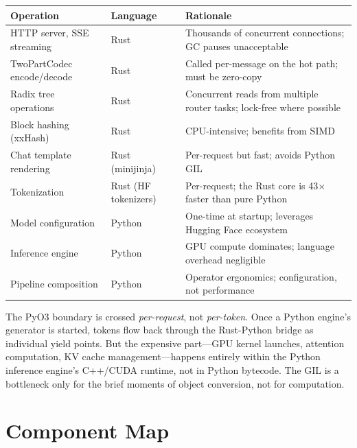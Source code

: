 \begin{center}
\small
\begin{tabular}{llp{7.5cm}}
\toprule
\textbf{Operation} & \textbf{Language} & \textbf{Rationale} \\
\midrule
HTTP server, SSE streaming & Rust & Thousands of concurrent connections; GC pauses unacceptable \\
TwoPartCodec encode/decode & Rust & Called per-message on the hot path; must be zero-copy \\
Radix tree operations & Rust & Concurrent reads from multiple router tasks; lock-free where possible \\
Block hashing (xxHash) & Rust & CPU-intensive; benefits from SIMD \\
Chat template rendering & Rust (minijinja) & Per-request but fast; avoids Python GIL \\
Tokenization & Rust (HF tokenizers) & Per-request; the Rust core is 43$\times$ faster than pure Python \\
Model configuration & Python & One-time at startup; leverages Hugging Face ecosystem \\
Inference engine & Python & GPU compute dominates; language overhead negligible \\
Pipeline composition & Python & Operator ergonomics; configuration, not performance \\
\bottomrule
\end{tabular}
\end{center}

\begin{insightbox}
The PyO3 boundary is crossed \emph{per-request}, not \emph{per-token}. Once a Python engine's generator is started, tokens flow back through the Rust-Python bridge as individual yield points. But the expensive part---GPU kernel launches, attention computation, KV cache management---happens entirely within the Python inference engine's C++/CUDA runtime, not in Python bytecode. The GIL is a bottleneck only for the brief moments of object conversion, not for computation.
\end{insightbox}

\section{Component Map}
\label{sec:architecture:map}


